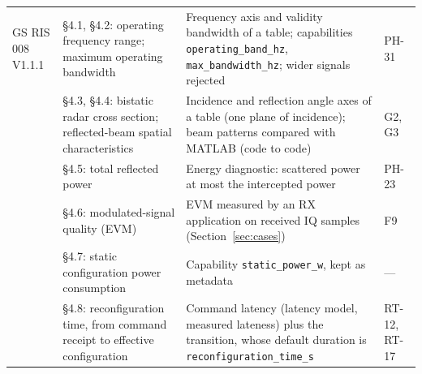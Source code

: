 \begin{table}[t]
\begin{tabular}{@{}L{0.95in}L{2.05in}L{2.95in}L{0.85in}@{}}
\midrule
GS RIS 008 V1.1.1 &
  \S4.1, \S4.2: operating frequency range; maximum operating
  bandwidth~\cite{ETSI_GS_RIS008} &
  Frequency axis and validity bandwidth of a table; capabilities
  \texttt{operating\_band\_hz}, \texttt{max\_bandwidth\_hz}; wider signals rejected &
  PH-31 \\
 & \S4.3, \S4.4: bistatic radar cross section; reflected-beam spatial
  characteristics~\cite{ETSI_GS_RIS008} &
  Incidence and reflection angle axes of a table (one plane of incidence); beam patterns
  compared with MATLAB (code to code) & G2, G3 \\
 & \S4.5: total reflected power~\cite{ETSI_GS_RIS008} &
  Energy diagnostic: scattered power at most the intercepted power & PH-23 \\
 & \S4.6: modulated-signal quality (EVM)~\cite{ETSI_GS_RIS008} &
  EVM measured by an RX application on received IQ samples
  (Section~\ref{sec:cases}) & F9 \\
 & \S4.7: static configuration power consumption~\cite{ETSI_GS_RIS008} &
  Capability \texttt{static\_power\_w}, kept as metadata & --- \\
 & \S4.8: reconfiguration time, from command receipt to effective
  configuration~\cite{ETSI_GS_RIS008} &
  Command latency (latency model, measured lateness) plus the transition, whose default
  duration is \texttt{reconfiguration\_time\_s} & RT-12, RT-17 \\
\bottomrule
\end{tabular}
\end{table}
